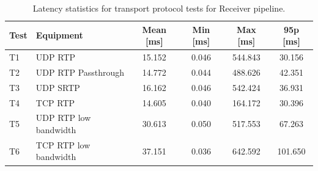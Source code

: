 \begin{table}[H]
    \centering
    \caption{Latency statistics for transport protocol tests for Receiver pipeline.}\label{tab:receiver_transport_latency}
    \begin{tabular}{|l|l|c|c|c|c|}
    \hline
    \textbf{Test} & \textbf{Equipment} & \textbf{Mean [ms]} & \textbf{Min [ms]} & \textbf{Max [ms]} & \textbf{95p [ms]} \\
    \hline
    T1 & UDP RTP & 15.152 & 0.046 & 544.843 & 30.156\\
    \hline
    T2 & UDP RTP Passthrough & 14.772 & 0.044 & 488.626 & 42.351  \\
    \hline
    T3 & UDP SRTP & 16.162 & 0.046 & 542.424 & 36.931 \\
    \hline
    T4 & TCP RTP & 14.605 & 0.040 & 164.172 & 30.396  \\
    \hline
    T5 & UDP RTP low bandwidth & 30.613 & 0.050 & 517.553 & 67.263\\
    \hline
    T6 & TCP RTP low bandwidth & 37.151 & 0.036 & 642.592 & 101.650 \\
    \hline
    \end{tabular}
\end{table}
